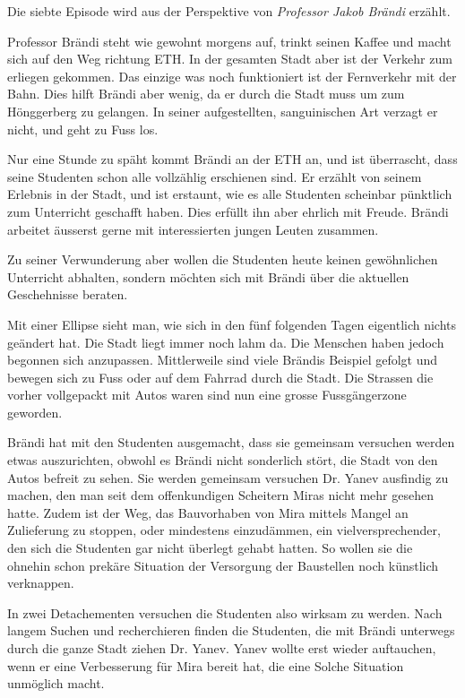 \documentclass[11pt,a4paper,ngerman]{scrreprt}
\begin{document}
Die siebte Episode wird aus der Perspektive von \emph{Professor Jakob Brändi} erzählt.

Professor Brändi steht wie gewohnt morgens auf, trinkt seinen Kaffee und macht
sich auf den Weg richtung ETH. In der gesamten Stadt aber ist der Verkehr zum
erliegen gekommen. Das einzige was noch funktioniert ist der Fernverkehr mit der
Bahn. Dies hilft Brändi aber wenig, da er durch die Stadt muss um zum
Hönggerberg zu gelangen. In seiner aufgestellten, sanguinischen Art verzagt er
nicht, und geht zu Fuss los.

Nur eine Stunde zu späht kommt Brändi an der ETH an, und ist überrascht, dass
seine Studenten schon alle vollzählig erschienen sind. Er erzählt von seinem
Erlebnis in der Stadt, und ist erstaunt, wie es alle Studenten scheinbar
pünktlich zum Unterricht geschafft haben. Dies erfüllt ihn aber ehrlich mit
Freude. Brändi arbeitet äusserst gerne mit interessierten jungen Leuten
zusammen.

Zu seiner Verwunderung aber wollen die Studenten heute keinen gewöhnlichen
Unterricht abhalten, sondern möchten sich mit Brändi über die aktuellen
Geschehnisse beraten.

Mit einer Ellipse sieht man, wie sich in den fünf folgenden Tagen eigentlich
nichts geändert hat. Die Stadt liegt immer noch lahm da. Die Menschen haben
jedoch begonnen sich anzupassen. Mittlerweile sind viele Brändis Beispiel
gefolgt und bewegen sich zu Fuss oder auf dem Fahrrad durch die Stadt. Die
Strassen die vorher vollgepackt mit Autos waren sind nun eine grosse
Fussgängerzone geworden.

Brändi hat mit den Studenten ausgemacht, dass sie gemeinsam versuchen werden
etwas auszurichten, obwohl es Brändi nicht sonderlich stört, die Stadt von den
Autos befreit zu sehen. Sie werden gemeinsam versuchen Dr. Yanev ausfindig zu
machen, den man seit dem offenkundigen Scheitern Miras nicht mehr gesehen
hatte. Zudem ist der Weg, das Bauvorhaben von Mira mittels Mangel an Zulieferung
zu stoppen, oder mindestens einzudämmen, ein vielversprechender, den sich die
Studenten gar nicht überlegt gehabt hatten. So wollen sie die ohnehin schon
prekäre Situation der Versorgung der Baustellen noch künstlich verknappen.

In zwei Detachementen versuchen die Studenten also wirksam zu werden. Nach
langem Suchen und recherchieren finden die Studenten, die mit Brändi unterwegs
durch die ganze Stadt ziehen Dr. Yanev. Yanev wollte erst wieder auftauchen,
wenn er eine Verbesserung für Mira bereit hat, die eine Solche Situation
unmöglich macht.
\end{document}
